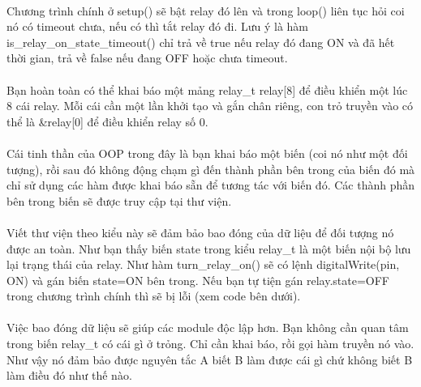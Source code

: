 \documentclass[12pt,a5paper]{book}
\begin{document}
\paragraph{}
Chương trình chính ở setup() sẽ bật relay đó lên và trong loop() liên tục hỏi coi nó có timeout chưa, nếu có thì tắt relay đó đi. Lưu ý là hàm is\_relay\_on\_state\_timeout() chỉ trả về true nếu relay đó đang ON và đã hết thời gian, trả về false nếu đang OFF hoặc chưa timeout.
\paragraph{}
Bạn hoàn toàn có thể khai báo một mảng relay\_t relay[8] để điều khiển một lúc 8 cái relay. Mỗi cái cần một lần khởi tạo và gắn chân riêng, con trỏ truyền vào có thể là \&relay[0] để điều khiển relay số 0.
\paragraph{}
Cái tinh thần của OOP trong đây là bạn khai báo một biến (coi nó như một đối tượng), rồi sau đó không động chạm gì đến thành phần bên trong của biến đó mà chỉ sử dụng các hàm được khai báo sẵn để tương tác với biến đó. Các thành phần bên trong biến sẽ được truy cập tại thư viện. 
\paragraph{}
Viết thư viện theo kiểu này sẽ đảm bảo bao đóng của dữ liệu để đối tượng nó được an toàn. Như bạn thấy biến state trong kiểu relay\_t là một biến nội bộ lưu lại trạng thái của relay. Như hàm turn\_relay\_on() sẽ có lệnh digitalWrite(pin, ON) và gán biến state=ON bên trong. Nếu bạn tự tiện gán relay.state=OFF trong chương trình chính thì sẽ bị lỗi (xem code bên dưới).
\paragraph{}
Việc bao đóng dữ liệu sẽ giúp các module độc lập hơn. Bạn không cần quan tâm trong biến relay\_t có cái gì ở trỏng. Chỉ cần khai báo, rồi gọi hàm truyền nó vào. Như vậy nó đảm bảo được nguyên tắc A biết B làm được cái gì chứ không biết B làm điều đó như thế nào.
\end{document}
